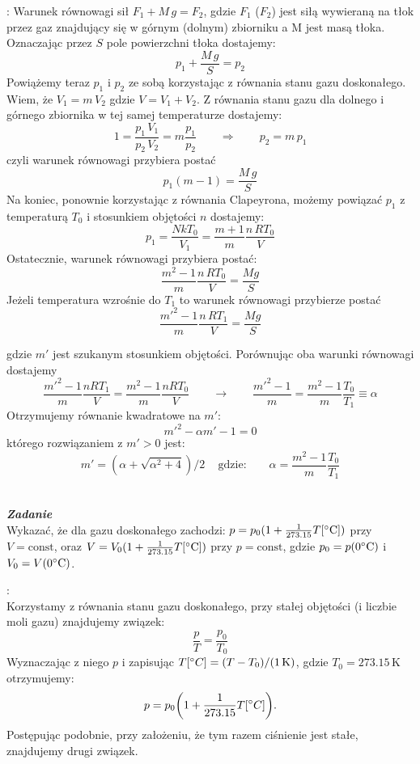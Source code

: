 \documentclass[11pt,a4paper]{article}
\newcounter{zadanie}\newcommand{\zadanie}[1][]{\addtocounter{zadanie}{1} ~\\  {\bf \emph{Zadanie \arabic{zadanie} #1 }} \\}
\begin{document}
\vspace{2mm}{\bf Rozwiązanie}: Warunek równowagi sił $F_1 + M\,g = F_2$, gdzie $F_1$ ($F_2$) jest siłą wywieraną na tłok przez gaz znajdujący się w górnym (dolnym) zbiorniku a M jest masą tłoka. Oznaczając przez $S$ pole powierzchni tłoka dostajemy:
\[
p_1 + \frac{M\,g}{S} = p_2
\]
Powiążemy teraz $p_1$ i $p_2$ ze sobą korzystając z równania stanu gazu doskonałego.
Wiem, że $V_1 = m\,V_2$ gdzie $V = V_1 + V_2$. Z równania stanu gazu dla dolnego i górnego zbiornika w tej samej temperaturze dostajemy:
\[
1=\frac{p_1\,V_1}{p_2\,V_2} = m\frac{p_1}{p_2} \qquad\Rightarrow\qquad p_2=m\,p_1
\]
czyli warunek równowagi przybiera postać
\[
p_1 (m-1) = \frac{M\,g}{S}
\]
Na koniec, ponownie korzystając z równania Clapeyrona, możemy powiązać $p_1$ z temperaturą $T_0$ i stosunkiem objętości $n$ dostajemy:
\[
p_1 = \frac{NkT_0}{V_1} = \frac{m+1}{m}\frac{n\,RT_0}{V}
\]
Ostatecznie, warunek równowagi przybiera postać:
\[
\frac{m^2-1}{m}\frac{n\,RT_0}{V} = \frac{Mg}{S}
\]
Jeżeli temperatura wzrośnie do $T_1$ to warunek równowagi przybierze postać
\[
\frac{m'^2-1}{m}\frac{n\,RT_1}{V} = \frac{Mg}{S}
\]
        
gdzie $m'$ jest szukanym stosunkiem objętości. Porównując oba warunki równowagi dostajemy
\[
\frac{m'^2-1}{m}\frac{n RT_1}{V}=\frac{m^2-1}{m}\frac{n RT_0}{V}
\qquad\to\qquad
\frac{m'^2-1}{m}=\frac{m^2-1}{m}\frac{T_0}{T_1}\equiv \alpha
\]
Otrzymujemy równanie kwadratowe na $m'$:
\[
m'^2 - \alpha m' - 1 = 0
\]
którego rozwiązaniem z $m' > 0$ jest:
\[
m' = (\alpha + \sqrt{\alpha^2 + 4})/2\,\quad\textrm{gdzie:}\qquad \alpha = \frac{m^2-1}{m}\frac{T_0}{T_1}
\]

\clearpage

\zadanie
Wykazać, że dla gazu doskonałego zachodzi: $p = p_0 (1 + \frac{1}{273.15} T[\degree \textrm{C}])$ przy $V = \textrm{const}$,
oraz $V = V_0 (1+ \frac{1}{273.15}  T[\degree \textrm{C}])$ przy $p=\textrm{const}$, gdzie $p_0 =p(0\degree \textrm{C})$ i $V_0 =V(0\degree \textrm{C})$.

\vspace{2mm}{\bf Rozwiązanie}:\\
Korzystamy z równania stanu gazu doskonałego, przy stałej objętości (i liczbie moli gazu) znajdujemy związek:
\[
\frac{p}{T} = \frac{p_0}{T_0}
\]
Wyznaczając z niego $p$ i zapisując $T[\degree C] = (T - T_0)/(1\,\textrm{K})$, gdzie $T_0 = 273.15\,\textrm{K}$ otrzymujemy:
\[
p=p_0 \bigg(1+\frac{1}{273.15}T[\degree C]\bigg) .
\]
Postępując podobnie, przy założeniu, że tym razem ciśnienie jest stałe, znajdujemy drugi związek.
\end{document}

